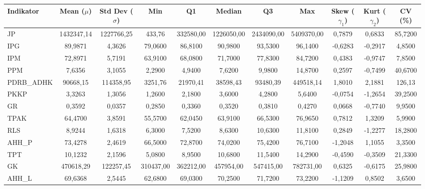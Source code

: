\begin{adjustbox}{max width=\textwidth}
\small
\begin{tabular}{|>{\centering\arraybackslash}p{2.5cm}|c|c|c|c|c|c|c|c|c|c|}
\hline
\textbf{Indikator} & \textbf{Mean ($\mu$)} & \textbf{Std Dev ($\sigma$)} & \textbf{Min} & \textbf{Q1} & \textbf{Median} & \textbf{Q3} & \textbf{Max} & \textbf{Skew ($\gamma_1$)} & \textbf{Kurt ($\gamma_2$)} & \textbf{CV (\%)} \\
\hline
JP & 1432347,14 & 1227766,25 & 433,76 & 332580,00 & 1226050,00 & 2434090,00 & 5409370,00 & 0,7879 & 0,6833 & 85,7200 \\
IPG & 89,9871 & 4,3626 & 79,0600 & 86,8100 & 90,9800 & 93,5300 & 96,1400 & -0,6283 & -0,2917 & 4,8500 \\
IPM & 72,8971 & 5,7191 & 63,9100 & 68,0800 & 71,7000 & 77,8300 & 84,7200 & 0,4383 & -0,9747 & 7,8500 \\
PPM & 7,6356 & 3,1055 & 2,2900 & 4,9400 & 7,6200 & 9,9800 & 14,8700 & 0,2597 & -0,7499 & 40,6700 \\
PDRB\_ADHK & 90668,15 & 114358,95 & 3251,76 & 21970,41 & 38598,43 & 93480,39 & 449518,14 & 1,8010 & 2,1881 & 126,13 \\
PKKP & 3,3263 & 1,3056 & 1,2600 & 2,1800 & 3,6000 & 4,2800 & 5,6400 & -0,0754 & -1,2654 & 39,2500 \\
GR & 0,3592 & 0,0357 & 0,2850 & 0,3360 & 0,3520 & 0,3810 & 0,4270 & 0,0668 & -0,7740 & 9,9500 \\
TPAK & 64,4700 & 3,8591 & 55,5700 & 62,0450 & 63,9100 & 66,5300 & 76,9650 & 0,7812 & 1,3209 & 5,9900 \\
RLS & 8,9244 & 1,6318 & 6,3000 & 7,5200 & 8,6300 & 10,6300 & 11,8100 & 0,2849 & -1,2277 & 18,2800 \\
AHH\_P & 73,4278 & 2,4619 & 66,5000 & 72,8700 & 74,0200 & 75,4200 & 76,7100 & -1,2048 & 1,1055 & 3,3500 \\
TPT & 10,1232 & 2,1596 & 5,0800 & 8,9500 & 10,6800 & 11,5400 & 14,2900 & -0,4590 & -0,3509 & 21,3300 \\
GK & 470618,29 & 122257,45 & 310437,00 & 362212,00 & 457954,00 & 547415,00 & 782731,00 & 0,6325 & -0,6175 & 25,9800 \\
AHH\_L & 69,6368 & 2,5445 & 62,6800 & 69,0300 & 70,2500 & 71,7200 & 73,2200 & -1,1209 & 0,8502 & 3,6500 \\
\hline
\end{tabular}
\end{adjustbox}
